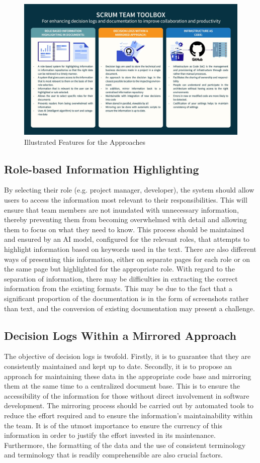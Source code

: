\begin{figure}[h!]
\centering
\includegraphics[width=\linewidth]{Images/toolbox.jpg}
\caption{Illustrated Features for the Approaches}
\label{fig:approach:1}
\end{figure}


\subsection*{Role-based Information Highlighting}
By selecting their role (e.g. project manager, developer), the system should allow users to access the information most relevant to their responsibilities. This will ensure that team members are not inundated with unnecessary information, thereby preventing them from becoming overwhelmed with detail and allowing them to focus on what they need to know. This process should be maintained and ensured by an \ac{AI} model, configured for the relevant roles, that attempts to highlight information based on keywords used in the text. There are also different ways of presenting this information, either on separate pages for each role or on the same page but highlighted for the appropriate role. With regard to the separation of information, there may be difficulties in extracting the correct information from the existing formats. This may be due to the fact that a significant proportion of the documentation is in the form of screenshots rather than text, and the conversion of existing documentation may present a challenge.
\subsection*{Decision Logs Within a Mirrored Approach}
The objective of decision logs is twofold. Firstly, it is to guarantee that they are consistently maintained and kept up to date. Secondly, it is to propose an approach for maintaining these data in the appropriate code base and mirroring them at the same time to a centralized document base. This is to ensure the accessibility of the information for those without direct involvement in software development. The mirroring process should be carried out by automated tools to reduce the effort required and to ensure the information's maintainability within the team. It is of the utmost importance to ensure the currency of this information in order to justify the effort invested in its maintenance. Furthermore, the formatting of the data and the use of consistent terminology and terminology that is readily comprehensible are also crucial factors.
